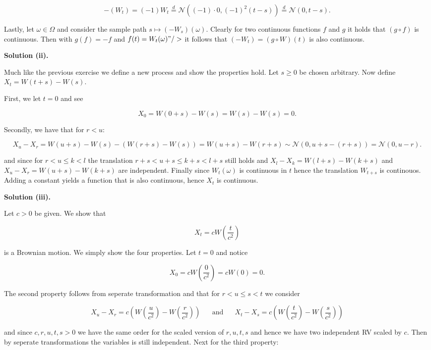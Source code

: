 \documentclass[
]{article}
\begin{document}
\[-(W_t)=(-1)W_t\stackrel{d}{=}\mathcal{N}((-1)\cdot0,(-1)^2(t-s))\stackrel{d}{=}\mathcal{N}( 0,t-s).\]

Lastly, let \(\omega \in \Omega\) and consider the sample path
\(s\mapsto (-W_s)(\omega)\). Clearly for two continuous functions \(f\)
and \(g\) it holds that \((g\circ f)\) is continuous. Then with
\(g(f)=-f\) and \(f(t)=W_t(\omega)"/>\) it follows that
\((-W_t)=(g\circ W)(t)\) is also continuous.

\textbf{Solution (ii).}

Much like the previous exercise we define a new process and show the
properties hold. Let \(s\ge 0\) be chosen arbitrary. Now define
\(X_t=W(t+s)-W(s)\).

First, we let \(t=0\) and see

\[X_0=W(0+s)-W(s)=W(s)-W(s)=0.\]

Secondly, we have that for \(r<u\):

\[X_u-X_r=W(u+s)-W(s)-(W(r+s)-W(s))=W(u+s)-W(r+s)\sim \mathcal{N}(0,u+s-(r+s))=\mathcal{N}(0,u-r).\]

and since for \(r<u\le k<l\) the translation \(r+s<u+s\le k+s<l+s\)
still holds and \(X_l-X_k=W(l+s)-W(k+s)\) and \(X_u-X_r=W(u+s)-W(k+s)\)
are independent. Finally since \(W_t(\omega)\) is continuous in \(t\)
hence the translation \(W_{t+s}\) is continouos. Adding a constant
yields a function that is also continuous, hence \(X_t\) is continuous.

\textbf{Solution (iii).}

Let \(c>0\) be given. We show that

\[X_t=cW\left(\frac{t}{c^2}\right)\]

is a Brownian motion. We simply show the four properties. Let \(t=0\)
and notice

\[X_0=cW\left(\frac{0}{c^2}\right)=cW(0)=0.\]

The second property follows from seperate transformation and that for
\(r<u\le s<t\) we consider

\[X_u-X_r=c\left(W\left(\frac{u}{c^2}\right)-W\left(\frac{r}{c^2}\right)\right)\hspace{20pt}\text{and}\hspace{20pt}X_t-X_s=c\left(W\left(\frac{t}{c^2}\right)-W\left(\frac{s}{c^2}\right)\right)\]

and since \(c,r,u,t,s>0\) we have the same order for the scaled version
of \(r,u,t,s\) and hence we have two independent RV scaled by \(c\).
Then by seperate transformations the variables is still independent.
Next for the third property:
\end{document}
